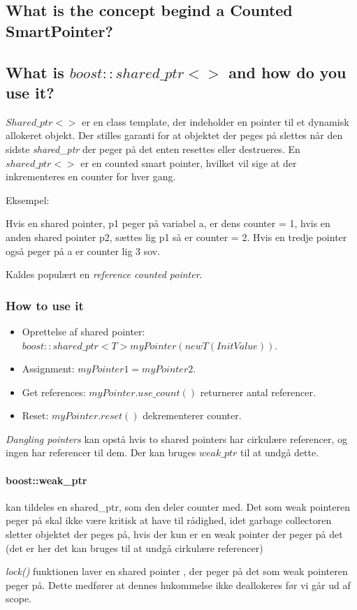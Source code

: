 \subsection{What is the concept begind a Counted SmartPointer?}

\subsection{What is $boost::shared\_ptr<>$ and how do you use it?}

$Shared\_ptr<>$ er en class template, der indeholder en pointer til et dynamisk allokeret objekt. Der stilles garanti for at objektet der peges på slettes når den sidste \textit{shared\_ptr} der peger på det enten resettes eller destrueres. En $shared\_ptr<>$ er en counted smart pointer, hvilket vil sige at der inkrementeres en counter for hver gang.

Eksempel:

Hvis en shared pointer, p1 peger på variabel a, er dens counter = 1, hvis en anden shared pointer p2, sættes lig p1 så er counter = 2. Hvis en tredje pointer også peger på a er counter lig 3 sov.

Kaldes populært en \textit{reference counted pointer}.

\subsubsection{How to use it}
\begin{itemize}
	\item Oprettelse af shared pointer: $boost::shared\_ptr<T> myPointer(new T(InitValue))$.
	\item Assignment: $myPointer1 = myPointer2$.
	\item Get references: $myPointer.use\_count()$ returnerer antal referencer.
	\item Reset: $myPointer.reset()$ dekrementerer counter.
\end{itemize}

\textit{Dangling pointers} kan opstå hvis to shared pointers har cirkulære referencer, og ingen har referencer til dem. Der kan bruges $weak\_ptr$ til at undgå dette.

\paragraph{boost::weak\_ptr}
kan tildeles en shared\_ptr, som den deler counter med.
Det som weak pointeren peger på skal ikke være kritisk at have til rådighed, idet garbage collectoren sletter objektet der peges på, hvis der kun er en weak pointer der peger på det (det er her det kan bruges til at undgå cirkulære referencer)

\textit{lock()} funktionen laver en shared pointer , der peger på det som weak pointeren peger på. Dette medfører at dennes hukommelse ikke deallokeres før vi går ud af scope.